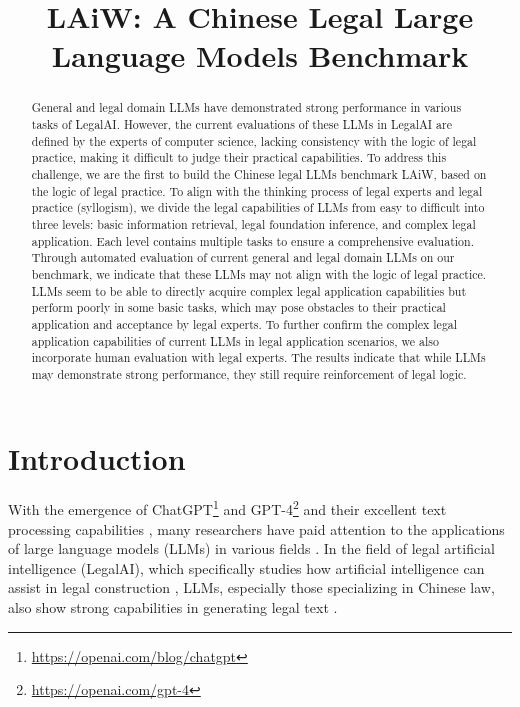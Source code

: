 \title{LAiW: A Chinese Legal Large Language Models Benchmark}



\maketitle

\begin{abstract}

General and legal domain LLMs have demonstrated strong performance in various tasks of LegalAI. However, the current evaluations of these LLMs in LegalAI are defined by the experts of computer science, lacking consistency with the logic of legal practice, making it difficult to judge their practical capabilities. To address this challenge, we are the first to build the Chinese legal LLMs benchmark LAiW, based on the logic of legal practice. To align with the thinking process of legal experts and legal practice (syllogism), we divide the legal capabilities of LLMs from easy to difficult into three levels: basic information retrieval, legal foundation inference, and complex legal application. Each level contains multiple tasks to ensure a comprehensive evaluation. Through automated evaluation of current general and legal domain LLMs on our benchmark, we indicate that these LLMs may not align with the logic of legal practice. LLMs seem to be able to directly acquire complex legal application capabilities but perform poorly in some basic tasks, which may pose obstacles to their practical application and acceptance by legal experts. To further confirm the complex legal application capabilities of current LLMs in legal application scenarios, we also incorporate human evaluation with legal experts. The results indicate that while LLMs may demonstrate strong performance, they still require reinforcement of legal logic.
\end{abstract}

\section{Introduction}

With the emergence of ChatGPT\footnote{\url{https://openai.com/blog/chatgpt}} and GPT-4\footnote{\url{https://openai.com/gpt-4}} and their excellent text processing capabilities \cite{zhao2023survey}, many researchers have paid attention to the applications of large language models (LLMs) in various fields \cite{wang2023huatuo, xie2023pixiu, ko2023can}. In the field of legal artificial intelligence (LegalAI), which specifically studies how artificial intelligence can assist in legal construction \cite{zhong2020does, locke2022case, feng2022legal}, LLMs, especially those specializing in Chinese law, also show strong capabilities in generating legal text \cite{cui2023chatlaw,LAWGPT,HanFei}.

